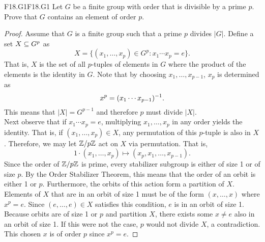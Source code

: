 \documentclass[../AlgebraQualSolutions.tex]{subfiles}
\begin{document}
	\begin{prob}{F18.G1}{F18.G1}
	Let $G$ be a finite group with order that is divisible by a prime $p$. Prove that $G$ contains an element of order $p$.
	\end{prob}
	
	\begin{proof}
	Assume that $G$ is a finite group such that a prime $p$ divides $|G|$. Define a set $X \subseteq G^p$ as
		\[X = \{(x_1, \ldots, x_p) \in G^p: x_1 \cdots x_p = e\}. \]
	That is, $X$ is the set of all $p$-tuples of elements in $G$ where the product of the elements is the identity in $G$. Note that by choosing $x_1, \ldots, x_{p-1}$, $x_p$ is determined as
		\[x^p = (x_1 \cdots x_{p - 1})^{-1}. \]
	This means that $|X| = G^{p-1}$ and therefore $p$ must divide $|X|$.\\
	
	Next observe that if $x_1 \cdots x_p = e$, multiplying $x_1, \ldots, x_p$ in any order yields the identity. That is, if $(x_1, \ldots, x_p) \in X$, any permutation of this $p$-tuple is also in $X$. Therefore, we may let $\mathbb{Z} / p\mathbb{Z}$ act on $X$ via permutation. That is,
		\[1 \cdot (x_1, \ldots, x_p) \mapsto (x_p, x_1, \ldots, x_{p-1}). \]
	Since the order of $\mathbb{Z} / p\mathbb{Z}$ is prime, every stabilizer subgroup is either of size 1 or of size $p$. By the Order Stabilizer Theorem, this means that the order of an orbit is either 1 or $p$. Furthermore, the orbits of this action form a partition of $X$. Elements of $X$ that are in an orbit of size 1 must be of the form $(x, \ldots, x)$ where $x^p = e$. Since $(e, \ldots, e) \in X$ satisfies this condition, $e$ is in an orbit of size 1. Because orbits are of size 1 or $p$ and partition $X$, there exists some $x \neq e$ also in an orbit of size 1. If this were not the case, $p$ would not divide $X$, a contradiction. This chosen $x$ is of order $p$ since $x^p = e$.
	\end{proof}
	
\end{document}
